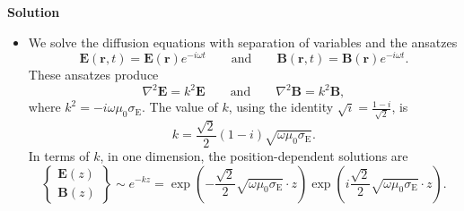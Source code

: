 \documentclass[11pt, a4paper]{article}
\newcommand{\eqtext}[1]{\qquad \text{#1} \qquad}
\renewcommand{\vec}[1]{\bm{#1}} %
\renewcommand{\r}{\vec{r}}
\newcommand{\E}{\vec{E}} %
\newcommand{\B}{\vec{B}} %
\newcommand{\mm}{\mu_{0}}  %
\renewcommand{\laplacian}{\nabla^{2}}
\begin{document}
\textbf{Solution}
\begin{itemize}
	\item We solve the diffusion equations with separation of variables and the ansatzes
	\begin{equation*}
		\E(\r, t) = \E(\r)e^{-i\omega t} \eqtext{and} \B(\r, t) = \B(\r)e^{-i\omega t}.
	\end{equation*}
	These ansatzes produce
	\begin{equation*}
		\laplacian \E = k^{2} \E \eqtext{and} \laplacian \B = k^{2} \B,
	\end{equation*}
	where $ k^{2} = -i \omega \mm \sigma_{\text{E}} $. The value of $ k $, using the identity $ \sqrt{i} = \frac{1-i}{\sqrt{2}} $, is
	\begin{equation*}
		k = \frac{\sqrt{2}}{2}(1 - i) \sqrt{\omega \mm \sigma_{\text{E}}}.
	\end{equation*}
	In terms of $ k $, in one dimension, the position-dependent solutions are
	\begin{equation*}
		\begin{Bmatrix}
            \E(z)\\
            \B(z)
		\end{Bmatrix}
        \sim e^{-kz} = \exp\left(- \frac{\sqrt{2}}{2}\sqrt{\omega \mm \sigma_{\text{E}}}\cdot z\right)\exp\left(i \frac{\sqrt{2}}{2}\sqrt{\omega \mm \sigma_{\text{E}}}\cdot z\right).
	\end{equation*}
	
\end{itemize}
\end{document}
